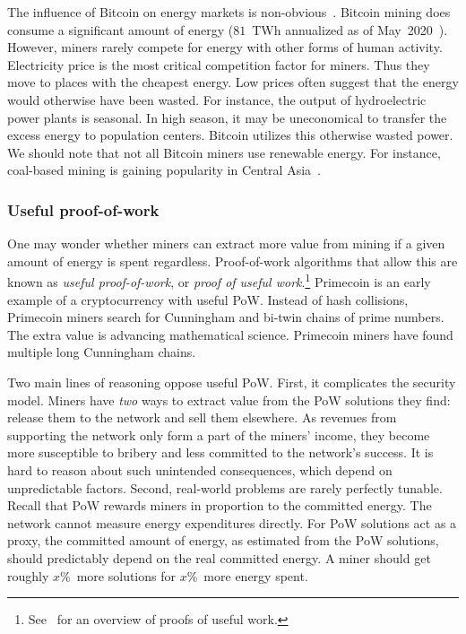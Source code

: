 The influence of Bitcoin on energy markets is non-obvious~\cite{Carter2020}.
Bitcoin mining does consume a significant amount of energy ($81$~TWh annualized as of May~2020~\cite{Rauchs2020}).
However, miners rarely compete for energy with other forms of human activity.
Electricity price is the most critical competition factor for miners.
Thus they move to places with the cheapest energy.
Low prices often suggest that the energy would otherwise have been wasted.
For instance, the output of hydroelectric power plants is seasonal.
In high season, it may be uneconomical to transfer the excess energy to population centers.
Bitcoin utilizes this otherwise wasted power.
We should note that not all Bitcoin miners use renewable energy.
For instance, coal-based mining is gaining popularity in Central Asia~\cite{8BTCStaff2020}.


\subsubsection*{Useful proof-of-work}

One may wonder whether miners can extract more value from mining if a given amount of energy is spent regardless.
Proof-of-work algorithms that allow this are known as \textit{useful proof-of-work}, or \textit{proof of useful work}.\footnote{See~\cite{Ball2017} for an overview of proofs of useful work.}
Primecoin is an early example of a cryptocurrency with useful PoW.
Instead of hash collisions, Primecoin miners search for Cunningham and bi-twin chains of prime numbers.
The extra value is advancing mathematical science.
Primecoin miners have found multiple long Cunningham chains.

Two main lines of reasoning oppose useful PoW.
First, it complicates the security model.
Miners have \textit{two} ways to extract value from the PoW solutions they find: release them to the network and sell them elsewhere.
As revenues from supporting the network only form a part of the miners' income, they become more susceptible to bribery and less committed to the network's success.
It is hard to reason about such unintended consequences, which depend on unpredictable factors.
Second, real-world problems are rarely perfectly tunable.
Recall that PoW rewards miners in proportion to the committed energy.
The network cannot measure energy expenditures directly.
For PoW solutions act as a proxy, the committed amount of energy, as estimated from the PoW solutions, should predictably depend on the real committed energy.
A miner should get roughly $x\%$~more solutions for $x\%$~more energy spent.


